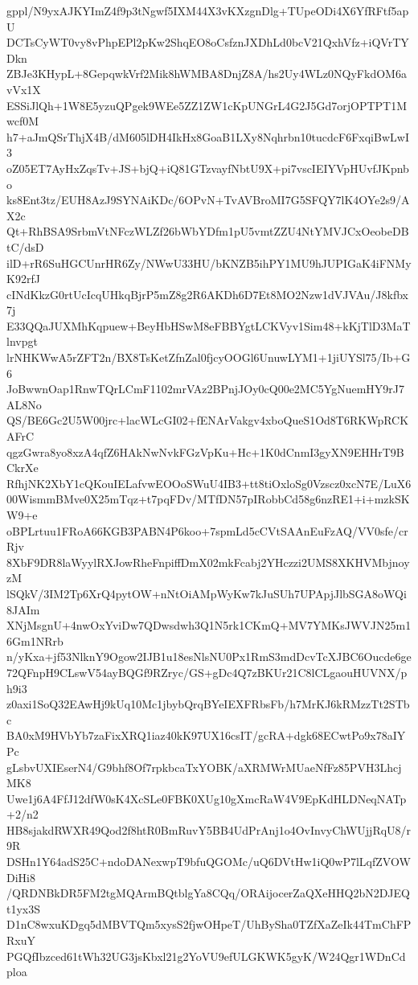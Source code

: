gppl/N9yxAJKYImZ4f9p3tNgwf5IXM44X3vKXzgnDlg+TUpeODi4X6YfRFtf5apU
DCTsCyWT0vy8vPhpEPl2pKw2ShqEO8oCsfznJXDhLd0bcV21QxhVfz+iQVrTYDkn
ZBJe3KHypL+8GepqwkVrf2Mik8hWMBA8DnjZ8A/hs2Uy4WLz0NQyFkdOM6avVx1X
ESSiJlQh+1W8E5yzuQPgek9WEe5ZZ1ZW1cKpUNGrL4G2J5Gd7orjOPTPT1Mwcf0M
h7+aJmQSrThjX4B/dM605lDH4IkHx8GoaB1LXy8Nqhrbn10tucdcF6FxqiBwLwI3
oZ05ET7AyHxZqsTv+JS+bjQ+iQ81GTzvayfNbtU9X+pi7vscIEIYVpHUvfJKpnbo
ks8Ent3tz/EUH8AzJ9SYNAiKDc/6OPvN+TvAVBroMI7G5SFQY7lK4OYe2s9/AX2c
Qt+RhBSA9SrbmVtNFczWLZf26bWbYDfm1pU5vmtZZU4NtYMVJCxOeobeDBtC/dsD
ilD+rR6SuHGCUnrHR6Zy/NWwU33HU/bKNZB5ihPY1MU9hJUPIGaK4iFNMyK92rfJ
cINdKkzG0rtUcIcqUHkqBjrP5mZ8g2R6AKDh6D7Et8MO2Nzw1dVJVAu/J8kfbx7j
E33QQaJUXMhKqpuew+BeyHbHSwM8eFBBYgtLCKVyv1Sim48+kKjTlD3MaTlnvpgt
lrNHKWwA5rZFT2n/BX8TsKetZfnZal0fjcyOOGl6UnuwLYM1+1jiUYSl75/Ib+G6
JoBwwnOap1RnwTQrLCmF1102mrVAz2BPnjJOy0cQ00e2MC5YgNuemHY9rJ7AL8No
QS/BE6Gc2U5W00jrc+lacWLcGI02+fENArVakgv4xboQueS1Od8T6RKWpRCKAFrC
qgzGwra8yo8xzA4qfZ6HAkNwNvkFGzVpKu+Hc+1K0dCnmI3gyXN9EHHrT9BCkrXe
RfhjNK2XbY1cQKouIELafvwEOOoSWuU4IB3+tt8tiOxloSg0Vzscz0xcN7E/LuX6
00WismmBMve0X25mTqz+t7pqFDv/MTfDN57pIRobbCd58g6nzRE1+i+mzkSKW9+e
oBPLrtuu1FRoA66KGB3PABN4P6koo+7spmLd5cCVtSAAnEuFzAQ/VV0sfe/crRjv
8XbF9DR8laWyylRXJowRheFnpiffDmX02mkFcabj2YHczzi2UMS8XKHVMbjnoyzM
lSQkV/3IM2Tp6XrQ4pytOW+nNtOiAMpWyKw7kJuSUh7UPApjJlbSGA8oWQi8JAIm
XNjMsgnU+4nwOxYviDw7QDwsdwh3Q1N5rk1CKmQ+MV7YMKsJWVJN25m16Gm1NRrb
n/yKxa+jf53NlknY9Ogow2IJB1u18esNlsNU0Px1RmS3mdDcvTcXJBC6Oucde6ge
72QFnpH9CLswV54ayBQGf9RZryc/GS+gDc4Q7zBKUr21C8lCLgaouHUVNX/ph9i3
z0axi1SoQ32EAwHj9kUq10Mc1jbybQrqBYeIEXFRbsFb/h7MrKJ6kRMzzTt2STbc
BA0xM9HVbYb7zaFixXRQ1iaz40kK97UX16csIT/gcRA+dgk68ECwtPo9x78aIYPc
gLsbvUXIEserN4/G9bhf8Of7rpkbcaTxYOBK/aXRMWrMUaeNfFz85PVH3LhcjMK8
Uwe1j6A4FfJ12dfW0sK4XcSLe0FBK0XUg10gXmcRaW4V9EpKdHLDNeqNATp+2/n2
HB8sjakdRWXR49Qod2f8htR0BmRuvY5BB4UdPrAnj1o4OvInvyChWUjjRqU8/r9R
DSHn1Y64adS25C+ndoDANexwpT9bfuQGOMc/uQ6DVtHw1iQ0wP7lLqfZVOWDiHi8
/QRDNBkDR5FM2tgMQArmBQtblgYa8CQq/ORAijocerZaQXeHHQ2bN2DJEQt1yx3S
D1nC8wxuKDgq5dMBVTQm5xysS2fjwOHpeT/UhBySha0TZfXaZeIk44TmChFPRxuY
PGQfIbzced61tWh32UG3jsKbxl21g2YoVU9efULGKWK5gyK/W24Qgr1WDnCdploa
